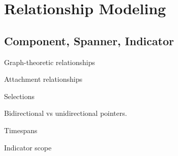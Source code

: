 \section{Relationship Modeling}\label{sec:relationship_modeling}

\subsection{Component, Spanner, Indicator}

Graph-theoretic relationships

Attachment relationships

Selections

Bidirectional vs unidirectional pointers.

Timespans

Indicator scope